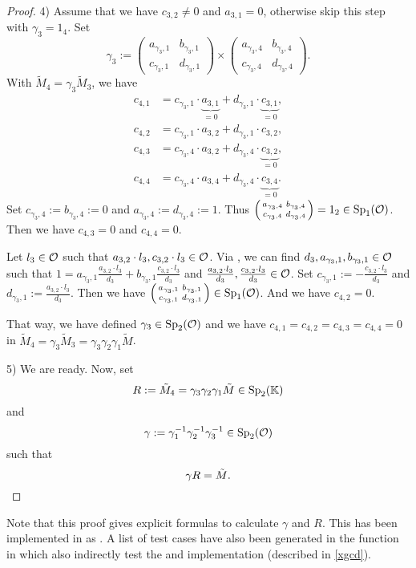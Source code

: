 \begin{lemma}[$solveR$]
\begin{proof}
4) Assume that we have $c_{3,2} \ne 0$ and $a_{3,1} = 0$, otherwise skip this step with $\gamma_3 = 1_4$. Set
\[ \gamma_3 := \begin{pmatrix}
a_{\gamma_3,1} & b_{\gamma_3,1} \\
c_{\gamma_3,1} & d_{\gamma_3,1}
\end{pmatrix} \times \begin{pmatrix}
a_{\gamma_3,4} & b_{\gamma_3,4} \\
c_{\gamma_3,4} & d_{\gamma_3,4}
\end{pmatrix} . \]
With $\tilde{M}_4 = \gamma_3 \tilde{M}_3$, we have
\begin{align*}
c_{4,1} &= c_{\gamma_3,1} \cdot \underbrace{a_{3,1}}_{=0} + d_{\gamma_3,1} \cdot \underbrace{c_{3,1}}_{=0} , \\
c_{4,2} &= c_{\gamma_3,1} \cdot a_{3,2} + d_{\gamma_3,1} \cdot c_{3,2} , \\
c_{4,3} &= c_{\gamma_3,4} \cdot a_{3,2} + d_{\gamma_3,4} \cdot \underbrace{c_{3,2}}_{=0} , \\
c_{4,4} &= c_{\gamma_3,4} \cdot a_{3,4} + d_{\gamma_3,4} \cdot \underbrace{c_{3,4}}_{=0} .
\end{align*}
Set $c_{\gamma_3,4} := b_{\gamma_3,4} := 0$ and $a_{\gamma_3,4} := d_{\gamma_3,4} := 1$. Thus $\left( \begin{smallmatrix} a_{\gamma_3,4} & b_{\gamma_3,4} \\ c_{\gamma_3,4} & d_{\gamma_3,4} \end{smallmatrix} \right) = 1_2 \in \operatorname{Sp}_1(\mathcal{O})$. Then we have $c_{4,3} = 0$ and $c_{4,4} = 0$.

Let $l_3 \in \mathcal{O}$ such that $a_{3,2} \cdot l_3, c_{3,2} \cdot l_3 \in \mathcal{O}$. Via , we can find $d_3,a_{\gamma_3,1},b_{\gamma_3,1} \in \mathcal{O}$ such that $1 = a_{\gamma_3,1} \frac{a_{3,2} \cdot l_3}{d_3} + b_{\gamma_3,1} \frac{c_{3,2} \cdot l_3}{d_3}$ and $\frac{a_{3,2} \cdot l_3}{d_3}, \frac{c_{3,2} \cdot l_3}{d_3} \in \mathcal{O}$. Set $c_{\gamma_3,1} := -\frac{c_{3,2} \cdot l_3}{d_3}$ and $d_{\gamma_3,1} := \frac{a_{3,2} \cdot l_3}{d_3}$. Then we have $\left( \begin{smallmatrix} a_{\gamma_3,1} & b_{\gamma_3,1} \\ c_{\gamma_3,1} & d_{\gamma_3,1} \end{smallmatrix} \right) \in \operatorname{Sp}_1(\mathcal{O})$. And we have $c_{4,2} = 0$.

That way, we have defined $\gamma_3 \in \operatorname{Sp}_2(\mathcal{O})$ and we have $c_{4,1} = c_{4,2} = c_{4,3} = c_{4,4} = 0$ in $\tilde{M}_4 = \gamma_3 \tilde{M}_3 = \gamma_3 \gamma_2 \gamma_1 \tilde{M}$.

5) We are ready. Now, set
\[ R := \tilde{M}_4 = \gamma_3 \gamma_2 \gamma_1 \tilde{M} \in \operatorname{Sp}_2(\mathbb{K}) \]
and
\[ \gamma :=  \gamma_1^{-1} \gamma_2^{-1} \gamma_3^{-1} \in \operatorname{Sp}_2(\mathcal{O}) \]
such that
\[ \gamma R = \tilde{M} . \qedhere \]
\end{proof}
\end{lemma}
Note that this proof gives explicit formulas to calculate $\gamma$ and $R$. This has been implemented in  as . A list of test cases have also been generated in the function  in  which also indirectly test the  and  implementation (described in \cref{xgcd}).

